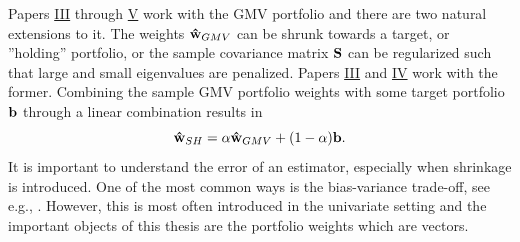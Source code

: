 \documentclass[12pt, twoside]{book}\usepackage{knitr}
\begin{document}
Papers \hyperref[sec:paper3]{III} through \hyperref[sec:paper5]{V} work with the GMV portfolio and there are two natural extensions to it. 
The weights $\mathbf{\hat{w}}_{GMV}$ can be shrunk towards a target, or ''holding'' portfolio, or the sample covariance matrix $\mathbf{S}$ can be regularized such that large and small eigenvalues are penalized. 
Papers \hyperref[sec:paper3]{III} and \hyperref[sec:paper4]{IV} work with the former.
Combining the sample GMV portfolio weights with some target portfolio $\mathbf{b}$ through a linear combination results in
\begin{equation}\label{eqn:linshrink}
  \mathbf{\hat{w}}_{SH} = \alpha\mathbf{\hat{w}}_{GMV} + (1-\alpha)\mathbf{b}.
\end{equation}
It is important to understand the error of an estimator, especially when shrinkage is introduced.
One of the most common ways is the bias-variance trade-off, see e.g., \citet[ch. 2.2]{james2013introduction}.
However, this is most often introduced in the univariate setting and the important objects of this thesis are the portfolio weights which are vectors.
\end{document}
